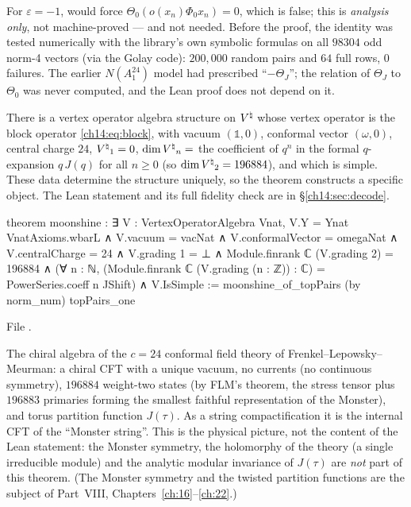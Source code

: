 \begin{warning}[title={Trap / dead end: The sign $\varepsilon$ and the earlier numerics}]
For $\varepsilon=-1$,  would force $\Theta_0(o(x_n)\Phi_0x_n)=0$, which is false; this is
\emph{analysis only}, not machine-proved — and not needed.  Before the proof, the identity was tested
numerically with the library's own symbolic formulas on all $98304$ odd norm-4 vectors (via the Golay
code): $200{,}000$ random pairs and $64$ full rows, $0$ failures.  The earlier $N(A_1^{24})$ model
had prescribed ``$-\Theta_J$''; the relation of $\Theta_J$ to $\Theta_0$ was never computed, and the Lean proof
does not depend on it.
\end{warning}

\begin{theorem}\label{ch14:thm:moonshine}
There is a vertex operator algebra structure on ${V^{\natural}}$ whose vertex operator is the block operator
\eqref{ch14:eq:block}, with vacuum $(\mathbb 1,0)$, conformal vector $(\omega,0)$, central charge $24$,
${V^{\natural}}_1=0$, $\dim{V^{\natural}}_n=$ the coefficient of $q^n$ in the formal $q$-expansion $q\,J(q)$ for all $n\ge0$
(so $\dim{V^{\natural}}_2=196884$), and which is simple.  These data determine the structure uniquely, so the
theorem constructs a specific object.  The Lean statement and its full fidelity check are in
\S\ref{ch14:sec:decode}.
\end{theorem}
\begin{leancode}
theorem moonshine :
    ∃ V : VertexOperatorAlgebra Vnat,
      V.Y = Ynat VnatAxioms.wbarL ∧ V.vacuum = vacNat ∧ V.conformalVector = omegaNat ∧
      V.centralCharge = 24 ∧
      V.grading 1 = ⊥ ∧
      Module.finrank ℂ (V.grading 2) = 196884 ∧
      (∀ n : ℕ, (Module.finrank ℂ (V.grading (n : ℤ)) : ℂ) = PowerSeries.coeff n JShift) ∧
      V.IsSimple :=
  moonshine_of_topPairs (by norm_num) topPairs_one
\end{leancode}
File .

\begin{physics}
The chiral algebra of the $c=24$ conformal field theory of Frenkel--Lepowsky--Meurman: a
chiral CFT with a unique vacuum, no currents (no continuous symmetry), $196884$ weight-two states
(by FLM's theorem, the stress tensor plus $196883$ primaries forming the smallest faithful
representation of the Monster), and torus partition function $J(\tau)$.  As a string
compactification it is the internal CFT of the ``Monster string''.  This is the physical picture,
not the content of the Lean statement: the Monster symmetry, the holomorphy of the theory (a single
irreducible module) and the analytic modular invariance of $J(\tau)$ are \emph{not} part of this
theorem.  (The Monster symmetry and the twisted partition functions are the subject of Part~VIII,
Chapters~\ref{ch:16}--\ref{ch:22}.)
\end{physics}

